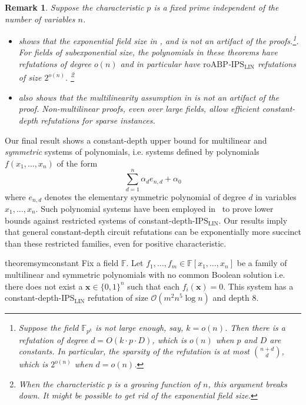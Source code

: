 \documentclass[11pt]{article}
\newtheorem{remark}[theorem]{Remark}
\newcommand{\Boo}{\{0,1 \}}
\newcommand{\bigO}{\mathcal{O}}
\newcommand{\F}{\mathbb{F}}
\newcommand{\IPSLIN}{\mathrm{IPS}_{\mathrm{LIN}}}
\begin{document}
\begin{remark}\label{remark: exp field size and multilinearity not artifacts}
    Suppose the characteristic $p$ is a fixed prime independent of the number of variables $n$.
    \begin{itemize}
        \item {} shows that the exponential field size in ,  and  is not an artifact of the proofs.\footnote{Suppose the field $\F_{p^k}$ is not large enough, say, $k = o(n)$. Then there is a refutation of degree $d = O(k\cdot p\cdot D)$, which is $o(n)$ when $p$ and $D$ are constants. In particular, the sparsity of the refutation is at most $\binom{n+d}{d}$, which is $2^{o(n)}$ when $d = o(n)$.}. For fields of subexponential size, the polynomials in these theorems have refutations of degree $o(n)$ and in particular have $\mathrm{roABP}$-$\IPSLIN$ refutations of size $2^{o(n)}.$ \footnote{When the characteristic $p$ is a growing function of $n$, this argument breaks down. It might be possible to get rid of the exponential field size.}
        \item {} also shows that the multilinearity assumption in  is not an artifact of the proof. Non-multilinear proofs, even over large fields, allow efficient constant-depth refutations for sparse instances. 
    \end{itemize}
\end{remark}

Our final result shows a constant-depth upper bound for multilinear and \emph{symmetric} systems of polynomials, i.e. systems defined by polynomials $f(x_1,\ldots,x_n)$ of the form 
\[
\sum_{d=1}^n \alpha_d e_{n,d} + \alpha_0
\]
where $e_{n,d}$ denotes the elementary symmetric polynomial of degree $d$ in variables $x_1,\ldots,x_n.$ Such polynomial systems have been employed in~\cite{FSTW21} to prove lower bounds against restricted systems of constant-depth-$\IPSLIN.$ Our results imply that general constant-depth circuit refutations can be exponentially more succinct than these restricted families, even for positive characteristic.


\begin{restatable}{theorem}{symconstant}\label{thm:ubd-sym-const-depth}
Fix a field $\F$. Let \break $f_1,\ldots,f_m \in \F[x_{1},\ldots,x_{n}]$ be a family of multilinear and symmetric polynomials with no common Boolean solution i.e. there does not exist a $\mathbf{x} \in \Boo^{n}$ such that each $f_{i}(\mathbf{x}) = 0$. This system has a constant-depth-$\IPSLIN$ refutation of size $\bigO(m^{2} n^{5} \log n)$ and depth $8$.
\end{restatable}
\end{document}
